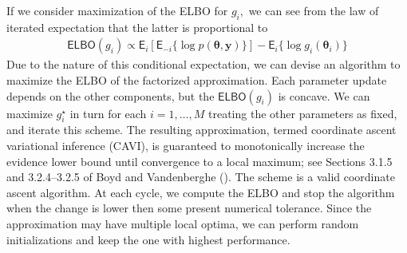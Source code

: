 \documentclass[
  11pt,
  letterpaper,
]{scrbook}
\theoremstyle{plain}
\theoremstyle{definition}
\theoremstyle{definition}
\theoremstyle{plain}
\theoremstyle{plain}
\theoremstyle{definition}
\theoremstyle{remark}
\begin{document}
If we consider maximization of the ELBO for \(g_i,\) we can see from the
law of iterated expectation that the latter is proportional to
\begin{align*}
 \mathsf{ELBO}(g_i) \propto \mathsf{E}_i \left[ \mathsf{E}_{-i} \{\log p(\boldsymbol{\theta}, \boldsymbol{y}) \}\right] - \mathsf{E}_i\{\log g_i(\boldsymbol{\theta}_i)\}
\end{align*} Due to the nature of this conditional expectation, we can
devise an algorithm to maximize the ELBO of the factorized
approximation. Each parameter update depends on the other components,
but the \(\mathsf{ELBO}(g_i)\) is concave. We can maximize
\(g^{\star}_i\) in turn for each \(i=1, \ldots, M\) treating the other
parameters as fixed, and iterate this scheme. The resulting
approximation, termed coordinate ascent variational inference (CAVI), is
guaranteed to monotonically increase the evidence lower bound until
convergence to a local maximum; see Sections 3.1.5 and 3.2.4--3.2.5 of
Boyd and Vandenberghe (). The
scheme is a valid coordinate ascent algorithm. At each cycle, we compute
the ELBO and stop the algorithm when the change is lower then some
present numerical tolerance. Since the approximation may have multiple
local optima, we can perform random initializations and keep the one
with highest performance.
\end{document}
